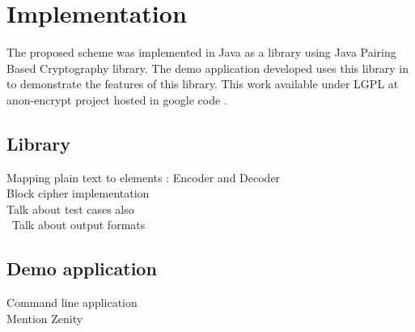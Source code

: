 \section{Implementation}
The proposed scheme was implemented in Java as a library using Java Pairing Based Cryptography \cite{jpbc} library. The demo application developed uses this library in to demonstrate the features of this library. This work available under LGPL at anon-encrypt project hosted in google code \cite{ae}.

\subsection{Library}
Mapping plain text to elements : Encoder and Decoder\\

Block cipher implementation\\

Talk about test cases also\\\
Talk about output formats


\subsection{Demo application}

Command line application\\
Mention Zenity\cite{zenity}

